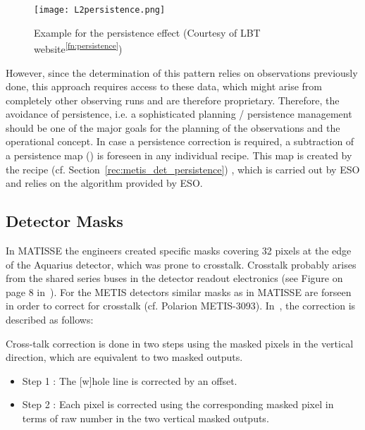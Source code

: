 \begin{figure}[ht]
  \centering
  \texttt{[image: L2persistence.png]}
  \caption[Persistence example]{Example for the persistence effect (Courtesy
    of LBT website\textsuperscript{\ref{fn:persistence}})}
  \label{fig:h2rg_persistence}
\end{figure}


However, since the determination of this pattern relies on observations previously done, this approach requires access to these data, which might arise from completely other observing runs and are therefore proprietary.
Therefore, the avoidance of persistence, i.e. a sophisticated planning / persistence management should be one of the major goals for the planning of the observations and the operational concept.
In case a persistence correction is required, a subtraction of a persistence map (\hyperref[dataitem:persistence_map]{}) is foreseen in any individual recipe. This map is created by the recipe \hyperref[rec:metis_det_persistence]{} (cf. Section~\ref{rec:metis_det_persistence}) , which is carried out by \ac{ESO} and relies on the algorithm provided by \ac{ESO}.



\subsection{Detector Masks}\label{ssec:criticaldetetctormasks}

In MATISSE the engineers created specific masks covering 32 pixels at the edge of the Aquarius detector, which was prone to crosstalk.
Crosstalk probably arises from the shared series buses in the detector readout electronics (see Figure on page 8 in~\cite{matisse_minutes}).
For the METIS detectors similar masks as in MATISSE are forseen in order to correct for crosstalk (cf. Polarion METIS-3093).
In~\cite{matisse_minutes}, the correction is described as follows:

\begin{displayquote}
    Cross-talk correction is done in two steps using the masked pixels in the vertical direction, which are equivalent to two masked outputs.
    \begin{itemize}
        \item Step 1 : The [w]hole line is corrected by an offset.
        \item Step 2 : Each pixel is corrected using the corresponding masked pixel in terms of raw
            number in the two vertical masked outputs.
    \end{itemize}
\end{displayquote}


